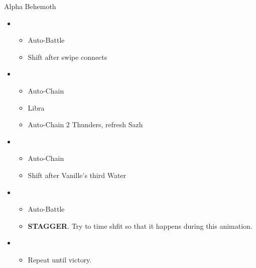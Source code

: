 	\begin{battle}[0:40]{Alpha Behemoth}
		\begin{itemize}
			\item \first
			      \begin{itemize}
				      \item Auto-Battle
				      \item Shift after swipe connects
			      \end{itemize}
			\item \second
			      \begin{itemize}
				      \item Auto-Chain
				      \item Libra
				      \item Auto-Chain 2 Thunders, refresh Sazh
			      \end{itemize}
			\item \fourth
			      \begin{itemize}
				      \item Auto-Chain
				      \item Shift after Vanille's third Water
			      \end{itemize}
			\item \first
			      \begin{itemize}
				      \item Auto-Battle
				      \item \textbf{STAGGER}. Try to time shfit so that it happens during this animation.
			      \end{itemize}
			\item \third
			      \begin{itemize}
				      \item Repeat until victory.
			      \end{itemize}
		\end{itemize}
	\end{battle}


	 
	
